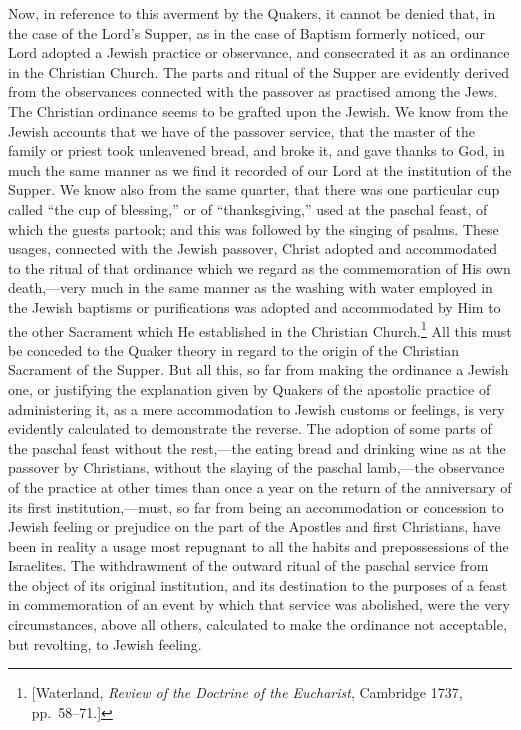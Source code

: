 \documentclass[
]{book}
\begin{document}
Now, in reference to this averment by the Quakers, it cannot be denied that, in the case of the Lord's Supper, as in the case of Baptism formerly noticed, our Lord adopted a Jewish practice or observance, and consecrated it as an ordinance in the Christian Church. The parts and ritual of the Supper are evidently derived from the observances connected with the passover as practised among the Jews. The Christian ordinance seems to be grafted upon the Jewish. We know from the Jewish accounts that we have of the passover service, that the master of the family or priest took unleavened bread, and broke it, and gave thanks to God, in much the same manner as we find it recorded of our Lord at the institution of the Supper. We know also from the same quarter, that there was one particular cup called ``the cup of blessing,'' or of ``thanksgiving,'' used at the paschal feast, of which the guests partook; and this was followed by the singing of psalms. These usages, connected with the Jewish passover, Christ adopted and accommodated to the ritual of that ordinance which we regard as the commemoration of His own death,---very much in the same manner as the washing with water employed in the Jewish baptisms or purifications was adopted and accommodated by Him to the other Sacrament which He established in the Christian Church.\footnote{{[}Waterland, \emph{Review of the Doctrine of the Eucharist}, Cambridge 1737, pp.~58--71.{]}} All this must be conceded to the Quaker theory in regard to the origin of the Christian Sacrament of the Supper. But all this, so far from making the ordinance a Jewish one, or justifying the explanation given by Quakers of the apostolic practice of administering it, as a mere accommodation to Jewish customs or feelings, is very evidently calculated to demonstrate the reverse. The adoption of some parts of the paschal feast without the rest,---the eating bread and drinking wine as at the passover by Christians, without the slaying of the paschal lamb,---the observance of the practice at other times than once a year on the return of the anniversary of its first institution,---must, so far from being an accommodation or concession to Jewish feeling or prejudice on the part of the Apostles and first Christians, have been in reality a usage most repugnant to all the habits and prepossessions of the Israelites. The withdrawment of the outward ritual of the paschal service from the object of its original institution, and its destination to the purposes of a feast in commemoration of an event by which that service was abolished, were the very circumstances, above all others, calculated to make the ordinance not acceptable, but revolting, to Jewish feeling.
\end{document}
